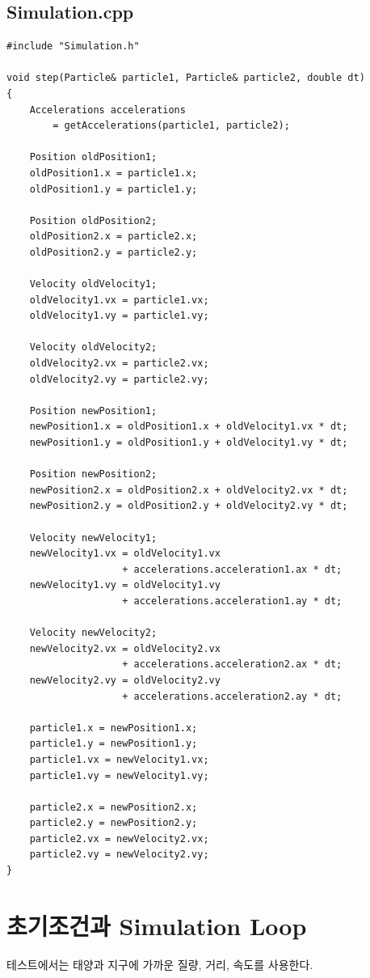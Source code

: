 \documentclass[11pt,a4paper]{article}
\begin{document}
\subsection{Simulation.cpp}
\begin{lstlisting}
#include "Simulation.h"

void step(Particle& particle1, Particle& particle2, double dt)
{
    Accelerations accelerations
        = getAccelerations(particle1, particle2);

    Position oldPosition1;
    oldPosition1.x = particle1.x;
    oldPosition1.y = particle1.y;

    Position oldPosition2;
    oldPosition2.x = particle2.x;
    oldPosition2.y = particle2.y;

    Velocity oldVelocity1;
    oldVelocity1.vx = particle1.vx;
    oldVelocity1.vy = particle1.vy;

    Velocity oldVelocity2;
    oldVelocity2.vx = particle2.vx;
    oldVelocity2.vy = particle2.vy;

    Position newPosition1;
    newPosition1.x = oldPosition1.x + oldVelocity1.vx * dt;
    newPosition1.y = oldPosition1.y + oldVelocity1.vy * dt;

    Position newPosition2;
    newPosition2.x = oldPosition2.x + oldVelocity2.vx * dt;
    newPosition2.y = oldPosition2.y + oldVelocity2.vy * dt;

    Velocity newVelocity1;
    newVelocity1.vx = oldVelocity1.vx
                    + accelerations.acceleration1.ax * dt;
    newVelocity1.vy = oldVelocity1.vy
                    + accelerations.acceleration1.ay * dt;

    Velocity newVelocity2;
    newVelocity2.vx = oldVelocity2.vx
                    + accelerations.acceleration2.ax * dt;
    newVelocity2.vy = oldVelocity2.vy
                    + accelerations.acceleration2.ay * dt;

    particle1.x = newPosition1.x;
    particle1.y = newPosition1.y;
    particle1.vx = newVelocity1.vx;
    particle1.vy = newVelocity1.vy;

    particle2.x = newPosition2.x;
    particle2.y = newPosition2.y;
    particle2.vx = newVelocity2.vx;
    particle2.vy = newVelocity2.vy;
}
\end{lstlisting}

\section{초기조건과 Simulation Loop}
테스트에서는 태양과 지구에 가까운 질량, 거리, 속도를 사용한다.
\end{document}
